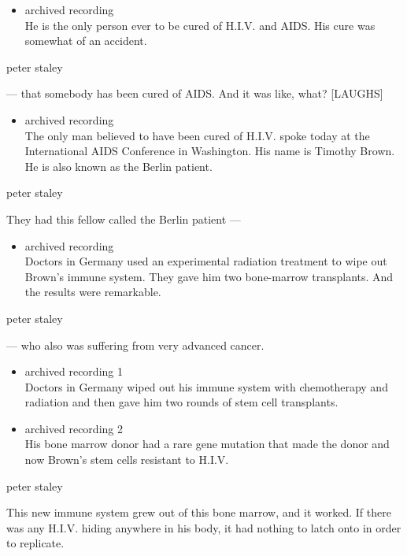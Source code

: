 \begin{itemize}
\tightlist
\item
  archived recording\\
  He is the only person ever to be cured of H.I.V. and AIDS. His cure
  was somewhat of an accident.
\end{itemize}

peter staley

--- that somebody has been cured of AIDS. And it was like, what?
{[}LAUGHS{]}

\begin{itemize}
\tightlist
\item
  archived recording\\
  The only man believed to have been cured of H.I.V. spoke today at the
  International AIDS Conference in Washington. His name is Timothy
  Brown. He is also known as the Berlin patient.
\end{itemize}

peter staley

They had this fellow called the Berlin patient ---

\begin{itemize}
\tightlist
\item
  archived recording\\
  Doctors in Germany used an experimental radiation treatment to wipe
  out Brown's immune system. They gave him two bone-marrow transplants.
  And the results were remarkable.
\end{itemize}

peter staley

--- who also was suffering from very advanced cancer.

\begin{itemize}
\item
  archived recording 1\\
  Doctors in Germany wiped out his immune system with chemotherapy and
  radiation and then gave him two rounds of stem cell transplants.
\item
  archived recording 2\\
  His bone marrow donor had a rare gene mutation that made the donor and
  now Brown's stem cells resistant to H.I.V.
\end{itemize}

peter staley

This new immune system grew out of this bone marrow, and it worked. If
there was any H.I.V. hiding anywhere in his body, it had nothing to
latch onto in order to replicate.

